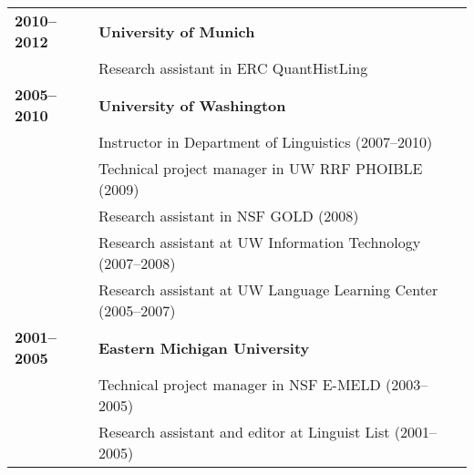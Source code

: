 \documentclass[11pt]{article}
\begin{document}
\begin{tabular}{lp{5.5in}}
\bf 2010--2012 & {\bf University of Munich} \\
& Research assistant in ERC QuantHistLing \\

\bf 2005--2010 & {\bf University of Washington} \\
& Instructor in Department of Linguistics (2007--2010) \\
& Technical project manager in UW RRF PHOIBLE (2009) \\
& Research assistant in NSF GOLD (2008) \\
& Research assistant at UW Information Technology (2007--2008) \\ %
& Research assistant at UW Language Learning Center (2005--2007) \\

\bf 2001--2005 & {\bf Eastern Michigan University} \\ 
& Technical project manager in NSF E-MELD (2003--2005) \\
& Research assistant and editor at Linguist List (2001--2005) \\
\end{tabular}
\end{document}
